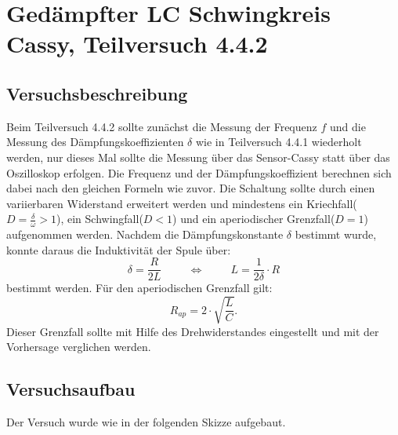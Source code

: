 \documentclass[12pt,a4paper]{article}
\begin{document}
\section{Gedämpfter LC Schwingkreis Cassy, Teilversuch 4.4.2}
\subsection{Versuchsbeschreibung}

Beim Teilversuch 4.4.2 sollte zunächst die Messung der Frequenz $f$ und die Messung des Dämpfungskoeffizienten $\delta$ wie in Teilversuch 4.4.1 wiederholt werden, nur dieses Mal sollte die Messung über das Sensor-Cassy statt über das Oszilloskop erfolgen.
Die Frequenz und der Dämpfungskoeffizient berechnen sich dabei nach den gleichen Formeln wie zuvor.
Die Schaltung sollte durch einen variierbaren Widerstand erweitert werden und mindestens ein Kriechfall($D=\frac{\delta}{\omega}>1$), ein Schwingfall($D<1$) und ein aperiodischer Grenzfall($D=1$) aufgenommen werden.
\newline
Nachdem die Dämpfungskonstante $\delta$ bestimmt wurde, konnte daraus die Induktivität der Spule über:
\begin{equation}
\delta =\frac{R}{2L} \hspace{1cm}
\Leftrightarrow  \hspace{1cm} L=\frac{1}{2\delta}\cdot R \label{Spule}
\end{equation}
bestimmt werden.
\newline
Für den aperiodischen Grenzfall gilt:
\begin{equation}
R_{ap}=2\cdot\sqrt{\frac{L}{C}}.
\label{aperiodischer GF}
\end{equation}
Dieser Grenzfall sollte mit Hilfe des Drehwiderstandes eingestellt und mit der Vorhersage verglichen werden.
\subsection{Versuchsaufbau}

Der Versuch wurde wie in der folgenden Skizze aufgebaut.
\end{document}
